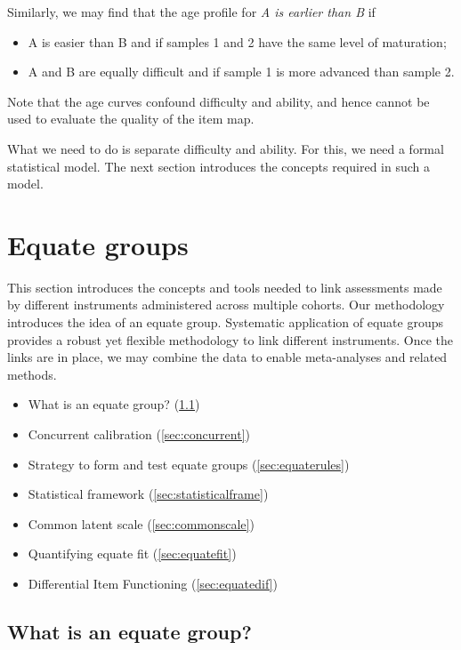 \documentclass[
]{book}
\providecommand{\tightlist}{%
  \setlength{\itemsep}{0pt}\setlength{\parskip}{0pt}}
\begin{document}
Similarly, we may find that the age profile for \emph{A is earlier than B} if

\begin{itemize}
\tightlist
\item
  A is easier than B and if samples 1 and 2 have the same level of maturation;
\item
  A and B are equally difficult and if sample 1 is more advanced than sample 2.
\end{itemize}

Note that the age curves confound difficulty and ability, and hence cannot be used to evaluate the quality of the item map.

What we need to do is separate difficulty and ability. For this, we need a formal statistical model. The next section introduces the concepts required in such a model.

\hypertarget{ch:equategroups}{%
\chapter{Equate groups}\label{ch:equategroups}}

This section introduces the concepts and tools needed to link assessments made by different instruments administered across multiple cohorts. Our methodology introduces the idea of an equate group. Systematic application of equate groups provides a robust yet flexible methodology to link different instruments. Once the links are in place, we may combine the data to enable meta-analyses and related methods.

\begin{itemize}
\tightlist
\item
  What is an equate group? (\ref{sec:eqdef})
\item
  Concurrent calibration (\ref{sec:concurrent})
\item
  Strategy to form and test equate groups (\ref{sec:equaterules})
\item
  Statistical framework (\ref{sec:statisticalframe})
\item
  Common latent scale (\ref{sec:commonscale})
\item
  Quantifying equate fit (\ref{sec:equatefit})
\item
  Differential Item Functioning (\ref{sec:equatedif})
\end{itemize}

\hypertarget{sec:eqdef}{%
\section{What is an equate group?}\label{sec:eqdef}}
\end{document}
